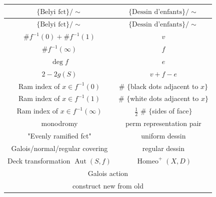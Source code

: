 \documentclass[pdf]{beamer}
\numberwithin{equation}{section}
\theoremstyle{plain}
\theoremstyle{plain}
\theoremstyle{remark}
\DeclareMathOperator{\Aut}{\operatorname{Aut}}
\begin{document}
\begin{frame}[fragile]
\begin{longtable}{c|c}
	\hline
	$\{\text{Belyi fct}\}/\sim$ & $\{\text{Dessin d'enfants}\}/\sim$	\\
	
	\hline
	\endhead
	\hline
	$\{\text{Belyi fct}\}/\sim$ & $\{\text{Dessin d'enfants}\}/\sim$	\\
	
	\hline
	\endfirsthead	
	\hline
	\endfoot
	\hline		
	\endlastfoot
	
	$\# f^{-1}(0) + \# f^{-1}(1)$ & $v$\\
	$\# f^{-1}(\infty)$ & $f$ \\
	$\deg f$ & $e$\\
	$2-2g(S)$ & $v+f-e$\\
	Ram index of $x \in f^{-1}(0)$ & $\#$ $\{$black dots adjacent to $x\}$\\
	Ram index of $x \in f^{-1}(1)$ & $\#$ $\{$white dots adjacent to $x\}$\\
	Ram index of $x \in f^{-1}(\infty)$ & $\frac{1}{2}$ $\#$ $\{$sides of face$\}$\\
	\hline
	monodromy & perm representation pair\\
	"Evenly ramified fct" & uniform dessin\\
	Galois/normal/regular covering & regular dessin\\
	Deck transformation $\Aut (S,f)$ & $\operatorname{Homeo}^+ (X,D)$\\
	\hline
	\multicolumn{2}{c}{Galois action}\\
	\hline
	\multicolumn{2}{c}{construct new from old}\\	
	\hline								
\end{longtable}
\end{frame}
\end{document}
